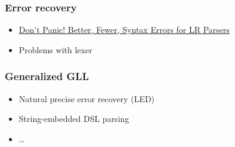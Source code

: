 \documentclass[xcolor=table,aspectratio=169]{beamer}
\begin{document}
\begin{frame}[fragile]
  \frametitle{Error recovery}  
  \begin{itemize}
    \item \href{https://arxiv.org/pdf/1804.07133.pdf}{Don’t Panic! Better, Fewer, Syntax Errors for LR Parsers}
    \item Problems with lexer
  \end{itemize} 
\end{frame}

\begin{frame}[fragile]
  \frametitle{Generalized GLL}  
  \begin{itemize}
    \item Natural precise error recovery (LED)
    \item String-embedded DSL parsing
    \item \ldots
  \end{itemize} 
\end{frame}
\end{document}

